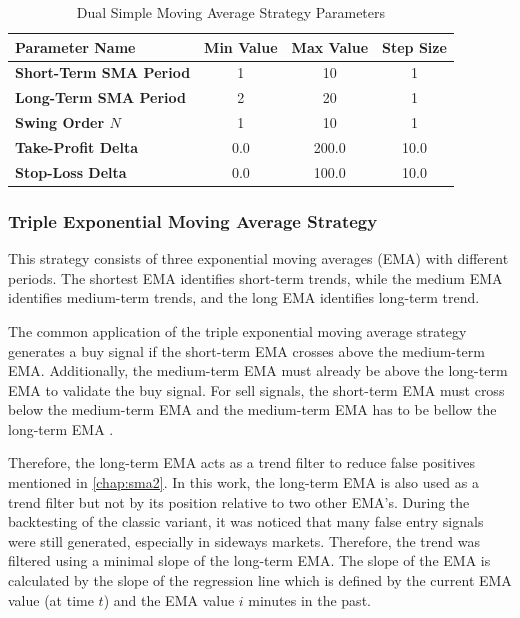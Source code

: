 \begin{table}[H]
    \centering
    \begin{tabular}{L{4cm}ccc}
        \toprule
        \textbf{Parameter Name} & Min Value & Max Value & Step Size
        \\
        \midrule
        \textbf{Short-Term SMA Period} & 1   & 10    & 1    \\
        \textbf{Long-Term SMA Period}  & 2   & 20    & 1    \\
        \textbf{Swing Order $N$}       & 1   & 10    & 1    \\
        \textbf{Take-Profit Delta}     & 0.0 & 200.0 & 10.0 \\
        \textbf{Stop-Loss Delta}       & 0.0 & 100.0 & 10.0 \\
        \bottomrule
    \end{tabular}
    \caption{Dual Simple Moving Average Strategy Parameters}
    \label{tbl:sma-strategy-parameters}
\end{table}

\subsubsection{Triple Exponential Moving Average Strategy}

This strategy consists of three exponential moving averages (EMA) with different periods.
The shortest EMA identifies short-term trends, while the medium EMA identifies medium-term trends, and the long EMA identifies long-term trend.

The common application of the triple exponential moving average strategy generates a buy signal if the short-term EMA crosses above the medium-term EMA.
Additionally, the medium-term EMA must already be above the long-term EMA to validate the buy signal.
For sell signals, the short-term EMA must cross below the medium-term EMA and the medium-term EMA has to be bellow the long-term EMA \cite{ema3-basics}.

Therefore, the long-term EMA acts as a trend filter to reduce false positives mentioned in \autoref{chap:sma2}.
In this work, the long-term EMA is also used as a trend filter but not by its position relative to two other EMA's.
During the backtesting of the classic variant, it was noticed that many false entry signals were still generated, especially in sideways markets.
Therefore, the trend was filtered using a minimal slope of the long-term EMA.
The slope of the EMA is calculated by the slope of the regression line which is defined by the current EMA value (at time $t$) and the EMA value $i$ minutes in the past.

